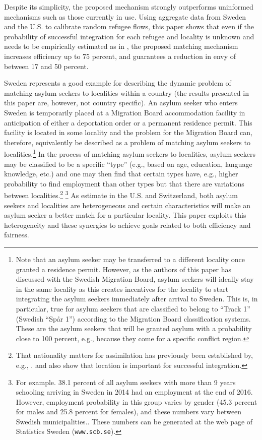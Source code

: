 \documentclass[12pt,fleqn]{article}
\begin{document}
Despite its simplicity, the proposed mechanism strongly outperforms uninformed mechanisms such as those currently in use. Using aggregate data from Sweden and the U.S. to calibrate random refugee flows, this paper shows that even if the probability of successful integration for each refugee and locality is unknown and needs to be empirically estimated as in \cite{bib:BansakEtAl}, the proposed matching mechanism increases efficiency up to 75 percent, and guarantees a reduction in envy of between 17 and 50 percent.

Sweden represents a good example for describing the dynamic problem of matching asylum seekers to localities within a country (the results presented in this paper are, however, not country specific). An asylum seeker who enters Sweden is temporarily placed at a Migration Board accommodation facility in anticipation of either a deportation order or a permanent residence permit. This facility is located in some locality and the problem for the Migration Board can, therefore, equivalently be described as a problem of matching asylum seekers to localities.\footnote{Note that an asylum seeker may be transferred to a different locality once granted a residence permit. However, as the authors of this paper has discussed with the Swedish Migration Board, asylum seekers will ideally stay in the same locality as this creates incentives for the locality to start integrating the asylum seekers immediately after arrival to Sweden. This is, in particular, true for asylum seekers that are classified to belong to ``Track 1'' (Swedish ``Sp\aa r 1'') according to the Migration Board classification systems. These are the asylum seekers that will be granted asylum with a probability close to 100 percent, e.g., because they come for a specific conflict region.} In the process of matching asylum seekers to localities, asylum seekers may be classified to be a specific ``type'' (e.g., based on age, education, language knowledge, etc.) and one may then find that certain types have, e.g., higher probability to find employment than other types but that there are variations between localities.\footnote{That nationality matters for assimilation has previously been established by, e.g., \citet{bib:RanEtAl}. \citet{bib:EdinEtAl} and \citet{bib:Damm} also show that location is important for successful integration.} \footnote{For example. 38.1 percent of all asylum seekers with more than 9 years schooling arriving in Sweden in 2014 had an employment at the end of 2016. However, employment probability in this group varies by gender (45.3 percent for males and 25.8 percent for females), and these numbers vary between Swedish municipalities.. These numbers can be generated at the web page of Statistics Sweden (\texttt{www.scb.se}).} As \cite{bib:BansakEtAl} estimate in the U.S. and Switzerland, both asylum seekers and localities are heterogeneous and certain characteristics will make an asylum seeker a better match for a particular locality. This paper exploits this heterogeneity and these synergies to achieve goals related to both efficiency and fairness.%
\end{document}
